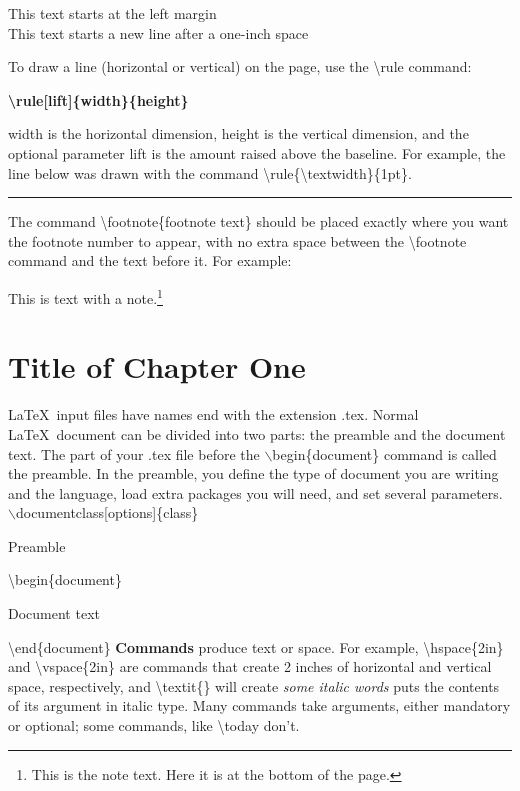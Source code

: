 \documentclass[12pt,openright]{book}
\begin{document}
This text starts at the left margin\\
\hspace*{1in}This text starts a new line after a one-inch space

To draw a line (horizontal or vertical) on the page, use the \textbackslash rule command:

\textbf{\textbackslash rule[lift]\{width\}\{height\}}

width is the horizontal dimension, height is the vertical dimension, and the optional
parameter lift is the amount raised above the baseline. For example, the line below was
drawn with the command \textbackslash rule\{\textbackslash textwidth\}\{1pt\}.

\rule{\textwidth}{1pt}

The command \textbackslash footnote\{footnote text\} should be placed exactly where you want the footnote number to appear, with no extra space between the \textbackslash footnote command and the text before it. For example: 

This is text with a note.\footnote{This is the note text. Here it is at the bottom of the page.}

\mainmatter
\chapter{Title of Chapter One}

\LaTeX\ input files have names end with the extension .tex. Normal \LaTeX\ document can be divided into two parts: the preamble and the document text. The part of your .tex file before the $\backslash$begin\{document\} command is called the preamble. In the preamble, you define the type of document you are writing and the language, load extra packages you will need, and set several parameters. 
\vskip 0.2in
$\backslash$documentclass[options]\{class\}

Preamble

\textbackslash begin\{document\}

Document text
  
\textbackslash end\{document\}
\vskip 0.2in
\textbf{Commands} produce text or space. For example, \textbackslash hspace\{2in\} and \textbackslash vspace\{2in\} are commands that create 2 inches of horizontal and vertical space, respectively, and \textbackslash textit\{\} will create \textit{some italic words} puts the contents of its argument in italic type. Many commands take arguments, either mandatory or optional; some commands, like \textbackslash today don’t.
\end{document}
